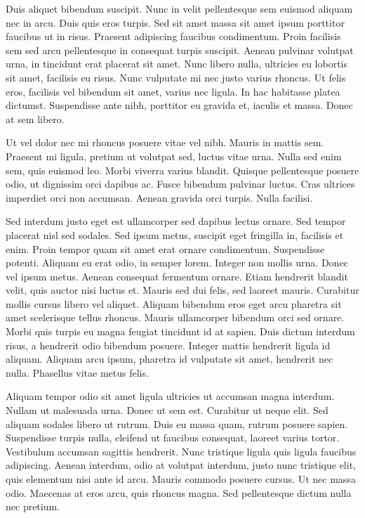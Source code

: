 \documentclass{EPUProjetDi}
\begin{document}
Duis aliquet bibendum suscipit. Nunc in velit pellentesque sem euismod aliquam nec in arcu. Duis quis eros turpis. Sed sit amet massa sit amet ipsum porttitor faucibus ut in risus. Praesent adipiscing faucibus condimentum. Proin facilisis sem sed arcu pellentesque in consequat turpis suscipit. Aenean pulvinar volutpat urna, in tincidunt erat placerat sit amet. Nunc libero nulla, ultricies eu lobortis sit amet, facilisis eu risus. Nunc vulputate mi nec justo varius rhoncus. Ut felis eros, facilisis vel bibendum sit amet, varius nec ligula. In hac habitasse platea dictumst. Suspendisse ante nibh, porttitor eu gravida et, iaculis et massa. Donec at sem libero.

Ut vel dolor nec mi rhoncus posuere vitae vel nibh. Mauris in mattis sem. Praesent mi ligula, pretium ut volutpat sed, luctus vitae urna. Nulla sed enim sem, quis euismod leo. Morbi viverra varius blandit. Quisque pellentesque posuere odio, ut dignissim orci dapibus ac. Fusce bibendum pulvinar luctus. Cras ultrices imperdiet orci non accumsan. Aenean gravida orci turpis. Nulla facilisi.

Sed interdum justo eget est ullamcorper sed dapibus lectus ornare. Sed tempor placerat nisl sed sodales. Sed ipsum metus, suscipit eget fringilla in, facilisis et enim. Proin tempor quam sit amet erat ornare condimentum. Suspendisse potenti. Aliquam eu erat odio, in semper lorem. Integer non mollis urna. Donec vel ipsum metus. Aenean consequat fermentum ornare. Etiam hendrerit blandit velit, quis auctor nisi luctus et. Mauris sed dui felis, sed laoreet mauris. Curabitur mollis cursus libero vel aliquet. Aliquam bibendum eros eget arcu pharetra sit amet scelerisque tellus rhoncus. Mauris ullamcorper bibendum orci sed ornare. Morbi quis turpis eu magna feugiat tincidunt id at sapien. Duis dictum interdum risus, a hendrerit odio bibendum posuere. Integer mattis hendrerit ligula id aliquam. Aliquam arcu ipsum, pharetra id vulputate sit amet, hendrerit nec nulla. Phasellus vitae metus felis.

Aliquam tempor odio sit amet ligula ultricies ut accumsan magna interdum. Nullam ut malesuada urna. Donec ut sem est. Curabitur ut neque elit. Sed aliquam sodales libero ut rutrum. Duis eu massa quam, rutrum posuere sapien. Suspendisse turpis nulla, eleifend ut faucibus consequat, laoreet varius tortor. Vestibulum accumsan sagittis hendrerit. Nunc tristique ligula quis ligula faucibus adipiscing. Aenean interdum, odio at volutpat interdum, justo nunc tristique elit, quis elementum nisi ante id arcu. Mauris commodo posuere cursus. Ut nec massa odio. Maecenas at eros arcu, quis rhoncus magna. Sed pellentesque dictum nulla nec pretium.
\end{document}
